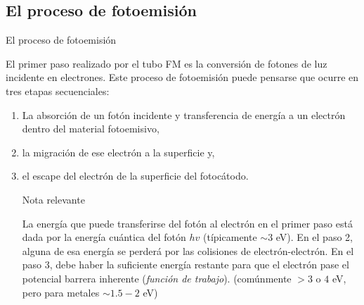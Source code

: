 \documentclass[a4paper,10pt]{beamer}
\begin{document}
\subsection{El proceso de fotoemisión}
\begin{frame}{El proceso de fotoemisión}
 
 \begin{justify}
  El primer paso realizado por el tubo FM es la conversión de fotones de luz incidente
  en electrones. Este proceso de fotoemisión puede pensarse que ocurre en tres etapas
  secuenciales:
  
   \begin{enumerate} [<+->]
  \item La absorción de un fotón incidente y transferencia de energía a un electrón
  dentro del material fotoemisivo,
  \item la migración de ese electrón a la superficie y,
  \item el escape del electrón de la superficie del fotocátodo. 
    \begin{block}{Nota relevante}
  \footnotesize{\begin{justify}La energía que puede transferirse del fotón al electrón en el primer paso está
  dada por la energía cuántica del fotón $hv$ (típicamente $\sim 3$ eV). En el paso 2, alguna de esa energía
  se perderá por las colisiones de electrón-electrón. En el paso 3, debe haber
  la suficiente energía restante para que el electrón pase el potencial barrera
  inherente (\emph{función de trabajo}). (comúnmente $> 3$ o $4$ eV, pero para 
  metales $\sim 1.5-2$ eV)\end{justify}}
 \end{block}
 \end{enumerate}
 
 \end{justify}
  
\end{frame}
\end{document}
